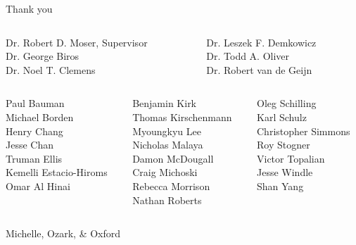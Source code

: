 \documentclass[mathserif]{beamer}
\begin{document}
\begin{frame}{Thank you}
\begin{center}
\begin{columns}
   \begin{column}{0.44\linewidth}
      Dr\@. Robert D. Moser, Supervisor \\
      Dr\@. George Biros \\
      Dr\@. Noel T. Clemens
  \end{column}
  \begin{column}{0.44\linewidth}
      Dr\@. Leszek F. Demkowicz \\
      Dr\@. Todd A. Oliver \\
      Dr\@. Robert van de Geijn
  \end{column}
\end{columns}
\vspace{2em}
\pause{}
\begin{columns}[t]
    \begin{column}{0.32\linewidth}
        Paul Bauman \\
        Michael Borden \\
        Henry Chang \\
        Jesse Chan \\
        Truman Ellis \\
        Kemelli Estacio-Hiroms \\
        Omar Al Hinai
    \end{column}
    \begin{column}{0.32\linewidth}
        Benjamin Kirk \\
        Thomas Kirschenmann \\
        Myoungkyu Lee \\
        Nicholas Malaya \\
        Damon McDougall \\
        Craig Michoski \\
        Rebecca Morrison \\
        Nathan Roberts
    \end{column}
    \begin{column}{0.32\linewidth}
        Oleg Schilling \\
        Karl Schulz \\
        Christopher Simmons \\
        Roy Stogner \\
        Victor Topalian \\
        Jesse Windle \\
        Shan Yang
    \end{column}
\end{columns}
\vspace{2em}
\pause{}
Michelle, Ozark, \& Oxford
\end{center}
\end{frame}
\end{document}
